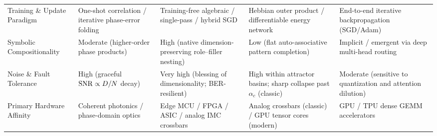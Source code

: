 \begin{table}[htbp]
\begin{tabularx}{\textwidth}{@{} >{\raggedright\arraybackslash}p{2.35cm} >{\raggedright\arraybackslash}X >{\raggedright\arraybackslash}X >{\raggedright\arraybackslash}X >{\raggedright\arraybackslash}X @{}}
\addlinespace[2pt]
Training \& Update Paradigm & One-shot correlation / iterative phase-error folding & Training-free algebraic / single-pass / hybrid SGD & Hebbian outer product / differentiable energy network & End-to-end iterative backpropagation (SGD/Adam) \\
\addlinespace[2pt]
Symbolic Compositionality & Moderate (higher-order phase products) & High (native dimension-preserving role--filler nesting) & Low (flat auto-associative pattern completion) & Implicit / emergent via deep multi-head routing \\
\addlinespace[2pt]
Noise \& Fault Tolerance & High (graceful $\mathrm{SNR} \propto D/N$ decay) & Very high (blessing of dimensionality; BER-resilient) & High within attractor basins; sharp collapse past $\alpha_c$ (classic) & Moderate (sensitive to quantization and attention dilution) \\
\addlinespace[2pt]
Primary Hardware Affinity & Coherent photonics / phase-domain optics & Edge MCU / FPGA / ASIC / analog IMC crossbars & Analog crossbars (classic) / GPU tensor cores (modern) & GPU / TPU dense GEMM accelerators \\
\bottomrule
\end{tabularx}
\end{table}

